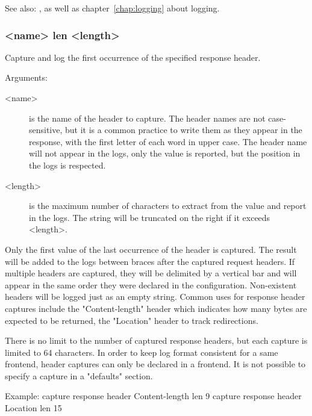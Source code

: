   See also: ,  as well as chapter~\ref{chap:logging}
             about logging.

\subsubsection[capture response header]{ <name> len <length>}

  Capture and log the first occurrence of the specified response header.
  

  Arguments:
  \begin{description}
  \item[<name>]    is the name of the header to capture. The header names are not
              case-sensitive, but it is a common practice to write them as they
              appear in the response, with the first letter of each word in
              upper case. The header name will not appear in the logs, only the
              value is reported, but the position in the logs is respected.

  \item[<length>]  is the maximum number of characters to extract from the value and
              report in the logs. The string will be truncated on the right if
              it exceeds <length>.
  \end{description}

  Only the first value of the last occurrence of the header is captured. The
  result will be added to the logs between braces \chr{\{\}} after the captured
  request headers. If multiple headers are captured, they will be delimited by
  a vertical bar \chr{|} and will appear in the same order they were declared in
  the configuration. Non-existent headers will be logged just as an empty
  string. Common uses for response header captures include the "Content-length"
  header which indicates how many bytes are expected to be returned, the
  "Location" header to track redirections.

  There is no limit to the number of captured response headers, but each
  capture is limited to 64 characters. In order to keep log format consistent
  for a same frontend, header captures can only be declared in a frontend. It
  is not possible to specify a capture in a "defaults" section.

  \begin{example}{Example:}
        capture response header Content-length len 9
        capture response header Location len 15
   \end{example}

